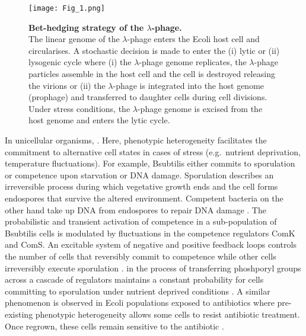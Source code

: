 \begin{figure}[!h]
\centering
\texttt{[image: Fig\_1.png]}
\caption[Bet-hedging strategy of the $\lambda$-phage]{\textbf{Bet-hedging strategy of the $\lambda$-phage.}\\
The linear genome of the $\lambda$-phage enters the \Gls{Ecoli} host cell and circularises. 
A stochastic decision is made to enter the (i) lytic or (ii) lysogenic cycle where (i) the $\lambda$-phage genome replicates, the $\lambda$-phage particles assemble in the host cell and the cell is destroyed releasing the virions or (ii) the $\lambda$-phage is integrated into the host genome (prophage) and transferred to daughter cells during cell divisions. 
Under stress conditions, the $\lambda$-phage genome is excised from the host genome and enters the lytic cycle.}
\label{fig0:bedhedging}
\end{figure}

In unicellular organisms, . Here, phenotypic heterogeneity facilitates the commitment to alternative cell states in cases of stress (e.g.~nutrient deprivation, temperature fluctuations). 
For example, \Gls{Bsubtilis} either commits to sporulation or competence upon starvation or DNA damage. 
Sporulation describes an irreversible process during which vegetative growth ends and the cell forms endospores that survive the altered environment. 
Competent bacteria on the other hand take up DNA from endospores to repair DNA damage \citep{Schultz2009}. 
The probabilistic and transient activation of competence in a sub-population of \Gls{Bsubtilis} cells is modulated by fluctuations in the competence regulators ComK and ComS. 
An excitable system of negative and positive feedback loops controls the number of cells that reversibly commit to competence while other cells irreversibly execute sporulation \citep{Suel2006}. 
 in the process of transferring phoshporyl groups across a cascade of regulators maintains a constant probability for cells committing to sporulation under nutrient deprived conditions \citep{Russell2017}. 
A similar phenomenon is observed in \Gls{Ecoli} populations exposed to antibiotics where pre-existing phenotypic heterogeneity allows some cells to resist antibiotic treatment. 
Once regrown, these cells remain sensitive to the antibiotic \citep{Balaban2004}. \\


